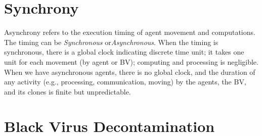 \section{Synchrony}
Asynchrony refers to the execution timing of agent movement and computations. The timing can be {\em Synchronous} or{\em Asynchronous}. When the timing is synchronous, there is a global clock indicating discrete time unit; it takes one unit for each movement (by agent or BV); computing and processing is negligible.
When we have asynchronous agents, there is no global clock, and the duration of any activity (e.g., processing, communication, moving) by the agents, the BV, and its clones is finite but unpredictable.

\section{Black Virus Decontamination}
